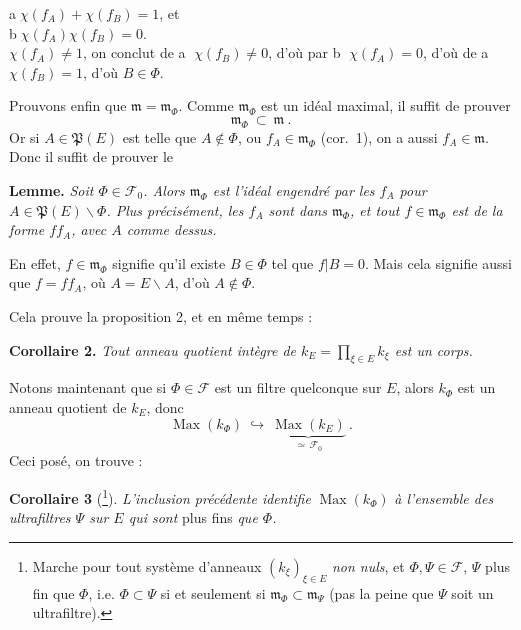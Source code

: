 \documentclass[11pt]{article}
\newcommand{\printedpage}[1]{\marginpar{\footnotesize p.~#1}}
\newcommand{\msp}[1]{\marginpar{\footnotesize [#1]}}
\begin{document}
\printedpage{194}

\noindent\hspace*{1em}\textcircled{a}\quad $\chi(f_A)+\chi(f_B)=1$, et\\
\hspace*{1em}\textcircled{b}\quad $\chi(f_A)\chi(f_B)=0$.\\
$\chi(f_A)\neq 1$, on conclut de \textcircled{a} $\chi(f_B)\neq 0$, d'où par \textcircled{b} $\chi(f_A)=0$, d'où de \textcircled{a} $\chi(f_B)=1$, d'où $B\in\Phi$.

\msp{page 7}
Prouvons enfin que $\mathfrak{m}=\mathfrak{m}_\Phi$. Comme $\mathfrak{m}_\Phi$ est un idéal maximal, il suffit de prouver
\[
\mathfrak{m}_\Phi\ \subset\ \mathfrak{m}\ .
\]
Or si $A\in\mathfrak{P}(E)$ est telle que $A\notin\Phi$, ou $f_A\in\mathfrak{m}_\Phi$ (cor.~1), on a aussi $f_A\in\mathfrak{m}$. Donc il suffit de prouver le

\textbf{Lemme.} \textit{Soit $\Phi\in\mathcal{F}_0$. Alors $\mathfrak{m}_\Phi$ est l'idéal engendré par les $f_A$ pour $A\in\mathfrak{P}(E)\backslash\Phi$. Plus précisément, les $f_A$ sont dans $\mathfrak{m}_\Phi$, et tout $f\in\mathfrak{m}_\Phi$ est de la forme $ff_A$, avec $A$ comme dessus.}

En effet, $f\in\mathfrak{m}_\Phi$ signifie qu'il existe $B\in\Phi$ tel que $f|B=0$. Mais cela signifie aussi que $f=ff_A$, où $A=E\backslash A$, d'où $A\notin\Phi$.

Cela prouve la proposition 2, et en même temps :

\textbf{Corollaire 2.} \textit{Tout anneau quotient intègre de $k_E=\prod_{\xi\in E}k_\xi$ est un corps.}

Notons maintenant que si $\Phi\in\mathcal{F}$ est un filtre quelconque sur $E$, alors $k_\Phi$ est un anneau quotient de $k_E$, donc
\[
\operatorname{Max}(k_\Phi)\ \hookrightarrow\ \underbrace{\operatorname{Max}(k_E)}_{\simeq\,\mathcal{F}_0}\ . \tag*{$(*)$}
\]
Ceci posé, on trouve :

\textbf{Corollaire 3} (\footnote[206]{Marche pour tout système d'anneaux $(k_\xi)_{\xi\in E}$ \textit{non nuls}, et $\Phi,\Psi\in\mathcal{F}$, $\Psi$ plus fin que $\Phi$, i.e. $\Phi\subset\Psi$ si et seulement si $\mathfrak{m}_\Phi\subset\mathfrak{m}_\Psi$ (pas la peine que $\Psi$ soit un ultrafiltre).}). \textit{L'inclusion précédente identifie} $\operatorname{Max}(k_\Phi)$ \textit{à l'ensemble des ultrafiltres $\Psi$ sur $E$ qui sont} plus fins \textit{que $\Phi$.}
\end{document}
